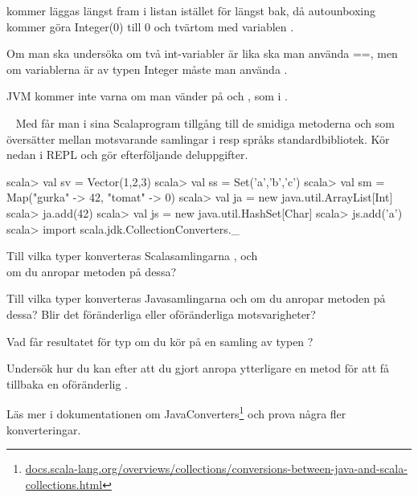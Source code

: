 \SubtaskSolved   {}

 kommer läggas längst fram i listan istället för längst bak, då autounboxing kommer göra Integer(0) till 0 och tvärtom med variablen .

\SubtaskSolved   Om man ska undersöka om två int-variabler är lika ska man använda ==, men om variablerna är av typen Integer måste man använda .

JVM kommer inte varna om man vänder på  och , som i .



\QUESTEND







\QUESTBEGIN

\Task  \what~  Med  får man i sina Scalaprogram tillgång till de smidiga metoderna  och  som översätter mellan motsvarande samlingar i resp språks standardbibliotek. Kör nedan i REPL och gör efterföljande deluppgifter.

\begin{REPL}
scala> val sv = Vector(1,2,3)
scala> val ss = Set('a','b','c')
scala> val sm = Map("gurka" -> 42, "tomat" -> 0)
scala> val ja = new java.util.ArrayList[Int]
scala> ja.add(42)
scala> val js = new java.util.HashSet[Char]
scala> js.add('a')
scala> import scala.jdk.CollectionConverters._
\end{REPL}

\Subtask Till vilka typer konverteras Scalasamlingarna
,  och \\  om du anropar metoden  på dessa?

\Subtask Till vilka typer konverteras Javasamlingarna  och   om du anropar metoden  på dessa? Blir det föränderliga eller oföränderliga motsvarigheter?

\Subtask Vad får resultatet för typ om du kör  på en samling av typen ?

\Subtask Undersök hur du kan efter att du gjort  anropa ytterligare en metod för att få tillbaka en oföränderlig .

\Subtask Läs mer i dokumentationen om JavaConverters\footnote{\href{http://docs.scala-lang.org/overviews/collections/conversions-between-java-and-scala-collections.html}{docs.scala-lang.org/overviews/collections/conversions-between-java-and-scala-collections.html}}
och prova några fler konverteringar.



